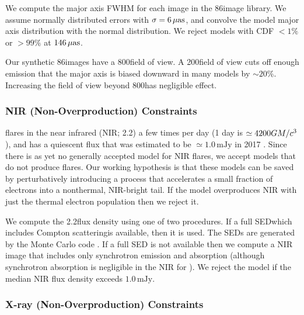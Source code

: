 We compute the major axis FWHM for each image in the 86\GHz image library.  We assume normally distributed errors with $\sigma = 6\,\mathrm{\mu as}$, and convolve the model major axis distribution with the normal distribution.  We reject models with CDF $< 1\%$ or $> 99\%$ at $146\,\mathrm{\mu as}$.

Our synthetic 86\GHz images have a 800\uas field of view.  A 200\uas field of view cuts off enough emission that the major axis is biased downward in many models by $\sim 20\%$.  Increasing the field of view beyond 800\uas has negligible effect.

\subsubsection{NIR (Non-Overproduction) Constraints}\label{subsec:nir}


\sgra flares in the near infrared (NIR; 2.2\um) a few times per day (1 day is $\simeq 4200 GM/c^3$), and has a quiescent flux that was estimated to be $\simeq 1.0\,\mathrm{mJy}$ in 2017 \citep{2020A&A...638A...2G}.  Since there is as yet no generally accepted model for NIR flares, we accept models that do not produce flares.  Our working hypothesis is that these models can be saved by perturbatively introducing a process that accelerates a small fraction of electrons into a nonthermal, NIR-bright tail.  If the model overproduces NIR with just the thermal electron population then we reject it.

We compute the 2.2\um flux density using one of two procedures.  If a full SED\textemdash which includes Compton scattering\textemdash is available, then it is used. The SEDs are generated by the \grmonty Monte Carlo code \citep{2009ApJS..184..387D, Wong_2022, Davelaar_2022}. If a full SED is not available then we compute a NIR image that includes only synchrotron emission and absorption (although synchrotron absorption is negligible in the NIR for \sgra).  We reject the model if the median NIR flux density exceeds $1.0\,\mathrm{mJy}$.

\subsubsection{X-ray (Non-Overproduction) Constraints}



